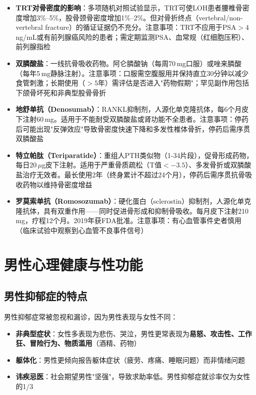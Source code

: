 \begin{enumerate}
\begin{itemize}[leftmargin=2cm]
	\item \textbf{TRT对骨密度的影响}：多项随机对照试验显示，TRT可使LOH患者腰椎骨密度增加3\%--5\%，股骨颈骨密度增加1\%--2\%。但对骨折终点（vertebral/non-vertebral fracture）的循证证据仍不充分。注意事项：TRT不应用于PSA$>4\,$ng/mL或有前列腺癌风险的患者；需定期监测PSA、血常规（红细胞压积）、前列腺指检

	\item \textbf{双膦酸盐}：一线抗骨吸收药物。阿仑膦酸钠（每周70\,mg口服）或唑来膦酸（每年5\,mg静脉注射）。注意事项：口服需空腹服用并保持直立30分钟以减少食管刺激；长期使用（$>5$年）需评估是否进入"药物假期"；罕见副作用包括下颌骨坏死和非典型股骨骨折

	\item \textbf{地舒单抗（Denosumab）}：RANKL抑制剂，人源化单克隆抗体，每6个月皮下注射60\,mg。适用于不能耐受双膦酸盐或肾功能不全患者。注意事项：停药后可能出现"反弹效应"导致骨密度快速下降和多发性椎体骨折，停药后需序贯双膦酸盐

	\item \textbf{特立帕肽（Teriparatide）}：重组人PTH类似物（1-34片段），促骨形成药物，每日20\,$\mu$g皮下注射。适用于严重骨质疏松（T值$< -3.5$）、多发骨折或双膦酸盐治疗无效者。最长使用2年（终身累计不超过24个月），停药后需序贯抗骨吸收药物以维持骨密度增益

	\item \textbf{罗莫索单抗（Romosozumab）}：硬化蛋白（sclerostin）抑制剂，人源化单克隆抗体，具有双重作用——同时促进骨形成和抑制骨吸收。每月皮下注射210\,mg，疗程12个月。2019年获FDA批准。注意事项：有心血管事件史者慎用（临床试验中观察到心血管不良事件信号）
\end{itemize}

\section{男性心理健康与性功能}
\label{sec:male_mental_health}

\subsection{男性抑郁症的特点}

男性抑郁症常被忽视和漏诊，因为男性表现与女性不同：

\begin{itemize}[leftmargin=2cm]
	\item \textbf{非典型症状}：女性多表现为悲伤、哭泣，男性更常表现为\textbf{易怒、攻击性、工作狂、冒险行为、物质滥用}（酒精、药物）
	\item \textbf{躯体化}：男性更倾向报告躯体症状（疲劳、疼痛、睡眠问题）而非情绪问题
	\item \textbf{讳疾忌医}：社会期望男性"坚强"，导致求助率低。男性抑郁症就诊率仅为女性的1/3
\end{itemize}


\end{enumerate}
